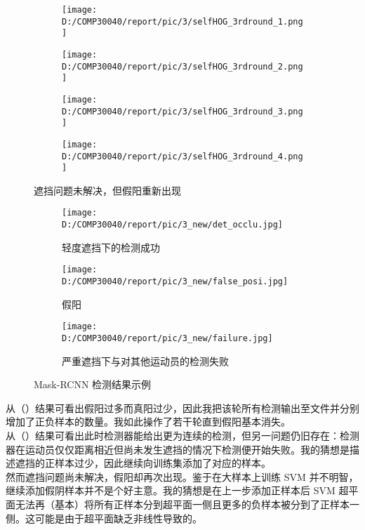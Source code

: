 \documentclass{article}
\begin{document}
\begin{figure}[h!]
  \begin{subfigure}[b]{\linewidth}
  \centering
    \texttt{[image: D:/COMP30040/report/pic/3/selfHOG\_3rdround\_1.png]} 
  \end{subfigure}
  \begin{subfigure}[b]{\linewidth}
  \centering
    \texttt{[image: D:/COMP30040/report/pic/3/selfHOG\_3rdround\_2.png]} 
  \end{subfigure}
  \begin{subfigure}[b]{\linewidth}
  \centering
    \texttt{[image: D:/COMP30040/report/pic/3/selfHOG\_3rdround\_3.png]} 
  \end{subfigure}
  \begin{subfigure}[b]{\linewidth}
  \centering
    \texttt{[image: D:/COMP30040/report/pic/3/selfHOG\_3rdround\_4.png]} 
  \end{subfigure}
  \caption{遮挡问题未解决，但假阳重新出现}
\end{figure}

\begin{figure}[h!]
  \begin{subfigure}[b]{\linewidth}
  \centering
    \texttt{[image: D:/COMP30040/report/pic/3\_new/det\_occlu.jpg]}
    \caption{轻度遮挡下的检测成功}
  \end{subfigure}
  \begin{subfigure}[b]{\linewidth}
  \centering
    \texttt{[image: D:/COMP30040/report/pic/3\_new/false\_posi.jpg]} 
    \caption{假阳}
  \end{subfigure}
  \begin{subfigure}[b]{\linewidth}
  \centering
    \texttt{[image: D:/COMP30040/report/pic/3\_new/failure.jpg]} 
    \caption{严重遮挡下与对其他运动员的检测失败}
  \end{subfigure}
  \caption{Mask-RCNN 检测结果示例}
\end{figure}

从（）结果可看出假阳过多而真阳过少，因此我把该轮所有检测输出至文件并分别增加了正负样本的数量。我如此操作了若干轮直到假阳基本消失。\\
从（）结果可看出此时检测器能给出更为连续的检测，但另一问题仍旧存在：检测器在运动员仅仅距离相近但尚未发生遮挡的情况下检测便开始失败。我的猜想是描述遮挡的正样本过少，因此继续向训练集添加了对应的样本。\\
然而遮挡问题尚未解决，假阳却再次出现。鉴于在大样本上训练 SVM 并不明智，继续添加假阴样本并不是个好主意。我的猜想是在上一步添加正样本后 SVM 超平面无法再（基本）将所有正样本分到超平面一侧且更多的负样本被分到了正样本一侧。这可能是由于超平面缺乏非线性导致的。
\end{document}
